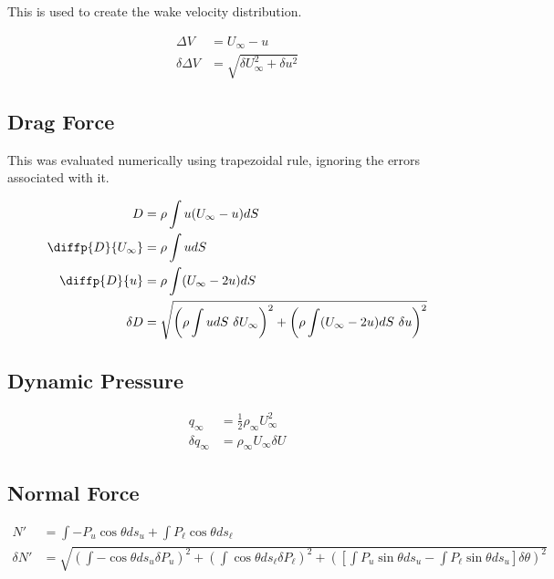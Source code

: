 \documentclass[runningheads]{llncs}
\begin{document}
This is used to create the wake velocity distribution.

\begin{align*}
    \Delta V &= U_\infty - u\\
    \delta \Delta V &= \sqrt{\delta U_\infty^2 + \delta u^2}
\end{align*}



\subsection{Drag Force}

This was evaluated numerically using trapezoidal rule, ignoring the errors associated with it.

\begin{align*}
    D &= \rho\int u (U_\infty - u) dS\\
    \diffp{D}{{U_\infty}} &= \rho \int  u dS\\
    \diffp{D}{u} &= \rho \int (U_\infty - 2u) dS\\
    \delta D &= \sqrt{\left(\rho \int  u dS \ \delta U_\infty \right)^2 + \left(\rho \int (U_\infty - 2u) dS \ \delta u \right)^2}
\end{align*}

\subsection{Dynamic Pressure}

\begin{align*}
    q_\infty &= \frac{1}{2} \rho_\infty U_\infty^2\\
    \delta q_\infty &= \rho_\infty U_\infty \delta U
\end{align*}

\subsection{Normal Force}


\begin{align*}
    N' &= \int-P_u\cos\theta ds_u + \int P_\ell\cos\theta ds_\ell \\
    \delta N' &= \sqrt{\left(\int-\cos\theta ds_u\delta P_u\right)^2 + \left(\int\cos\theta ds_\ell\delta P_\ell\right)^2 + \left(\left[\int P_u\sin\theta ds_u - \int P_\ell\sin\theta ds_u\right]\delta\theta\right)^2}
\end{align*}
\end{document}
